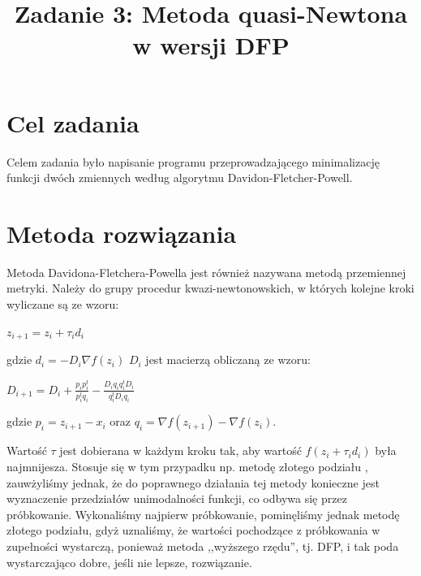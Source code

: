 \documentclass{classrep}
\author{%
  \studentinfo{Michał Janiszewski}{169485} \and
  \studentinfo{Leszek Wach}{169513}
}
\title{Zadanie 3: Metoda quasi-Newtona w wersji DFP}
\begin{document}
\maketitle

\section{Cel zadania}
Celem zadania było napisanie programu przeprowadzającego minimalizację funkcji dwóch zmiennych według algorytmu Davidon-Fletcher-Powell.

\section{Metoda rozwiązania}
Metoda Davidona-Fletchera-Powella jest również nazywana metodą przemiennej metryki. Należy do grupy procedur kwazi-newtonowskich, w których kolejne kroki wyliczane są ze wzoru:
\begin{center}
	$z_{i+1} = z_i + \tau_i d_i$
\end{center}
gdzie $d_i = -D_i \nabla f(z_i)$
$D_i$ jest macierzą obliczaną ze wzoru:
\begin{center}
\label{eq.dMatrix}
$D_{i+1} = D_i + \frac{p_i p^{t}_i}{p^{t}_i q_i} - \frac{D_i q_i q^{t}_i D_i}{q^{t}_i D_i q_i}$\\
\end{center}
gdzie $p_i = z_{i + 1} - x_i$ oraz $q_i = \nabla f(z_{i+1}) - \nabla f(z_i)$.

Wartość $\tau$ jest dobierana w każdym kroku tak, aby wartość $f(z_i + \tau_i d_i)$ była najmnijesza. Stosuje się w tym przypadku np. metodę złotego podziału \cite{wiley}, zauwżyliśmy jednak, że do poprawnego działania tej metody konieczne jest wyznaczenie przedziałów unimodalności funkcji, co odbywa się przez próbkowanie. Wykonaliśmy najpierw próbkowanie, pominęliśmy jednak metodę złotego podziału, gdyż uznaliśmy, że wartości pochodzące z próbkowania w zupełności wystarczą, ponieważ metoda ,,wyższego rzędu'', tj. DFP, i tak poda wystarczająco dobre, jeśli nie lepsze, rozwiązanie.
\end{document}
